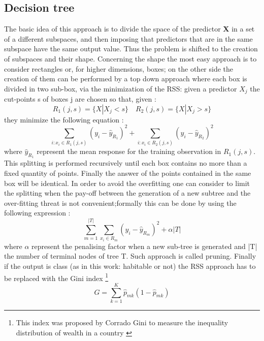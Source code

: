 \documentclass[
12pt, %
a4paper, %
oneside, %
headinclude,footinclude, %
BCOR5mm, %
]{scrartcl}
\begin{document}
\subsection{Decision tree}

The basic idea of this approach is to divide the space of the predictor \textbf{X} in a set of a different subspaces, and then imposing that predictors that are in the same subspace have the same output value. Thus the problem is shifted to the creation of subspaces and their shape. Concerning the shape the most easy approach is to consider rectangles or, for higher dimensions, boxes; on the other side the creation of them can be performed by a top down approach where each box is divided in two sub-box, via the minimization of the RSS: given a predictor $X_{j}$ the cut-points s of boxes j are chosen so that, given \cite{james2013introduction}:   
\begin{equation}
R_{1}(j,s)= \{X | X_{j} < s \} \quad R_{2}(j,s)= \{X | X_{j} > s \}
\end{equation}
they minimize the following equation \cite{james2013introduction}: 
\begin{equation}
\sum_{i: x_{i} \in  R_{1}(j,s)}(y_{i}-\hat{y}_{R_{1}})^{2}+\sum_{i: x_{i} \in  R_{2}(j,s)}(y_{i}-\hat{y}_{R_{2}})^{2}
\end{equation}
where $\hat{y}_{R_{1}}$ represent the mean response for the training observation in $R_{1}(j,s)$. This splitting is performed recursively until each box contains no more than a fixed quantity of points. Finally the answer of the points contained in the same box will be identical. In order to avoid the overfitting one can consider to limit the splitting when the pay-off between the generation of a new subtree and the over-fitting threat is not convenient;formally this can be done by using the following expression \cite{james2013introduction}: 
\begin{equation}
\sum_{m=1}^{|T|}\sum_{x_{i}\in R_{m}}(y_{i}-\hat{y}_{R_{m}})^{2}+\alpha|T|
\end{equation}
where $\alpha$ represent the penalising factor when a new sub-tree is generated and |T| the number of terminal nodes of tree T. Such approach is called pruning. Finally if the output is class (as in this work: habitable or not) the RSS approach has to be replaced with the Gini index \footnote{This index was proposed by Corrado Gini to measure the inequality distribution of wealth in a country \cite{gini1912variabilita}}
\begin{equation}
G=\sum_{k=1}^{K}\hat{p}_{mk}(1-\hat{p}_{mk})
\end{equation}
\end{document}
